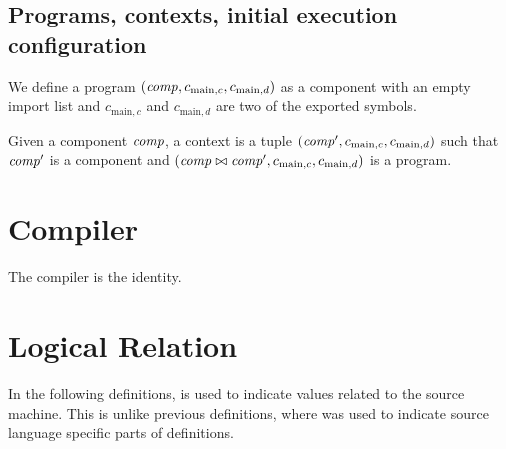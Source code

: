 \documentclass[a4paper]{article}
\begin{document}
\subsection{Programs, contexts, initial execution configuration}
\label{sec:programs}

\begin{definition}
  We define a program $(\var{comp}, c_{\mathrm{main},c}, c_{\mathrm{main},d})$ as a component with an empty import list and $c_{\mathrm{main},c}$ and $c_{\mathrm{main},d}$ are two of the exported symbols.

  Given a component $\var{comp}$, a context is a tuple $(\var{comp'}, c_{\mathrm{main},c}, c_{\mathrm{main},d})$ such that $\var{comp'}$ is a component and $(\var{comp} \bowtie \var{comp'}, c_{\mathrm{main},c}, c_{\mathrm{main},d})$ is a program.
\end{definition}

\begin{definition}
  \begin{mathpar}
  \end{mathpar}
\end{definition}

\section{Compiler}
\label{sec:compiler}

The compiler is the identity.

\section{Logical Relation}
In the following definitions,  is used to indicate values related to the source machine. This is unlike previous definitions, where  was used to indicate source language specific parts of definitions.
\end{document}
